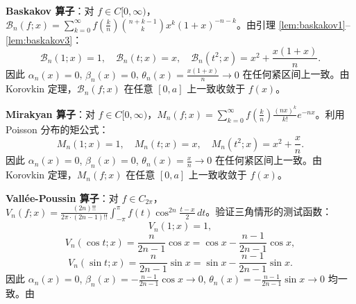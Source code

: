 \textbf{Baskakov 算子}：对 $f\in C[0,\infty)$，$\mathcal{B}_n(f;x)=\sum_{k=0}^\infty f(\frac{k}{n})\binom{n+k-1}{k}x^k(1+x)^{-n-k}$。由引理 \ref{lem:baskakov1}--\ref{lem:baskakov3}：
\[
\mathcal{B}_n(1;x)=1,\quad \mathcal{B}_n(t;x)=x,\quad \mathcal{B}_n(t^2;x)=x^2+\frac{x(1+x)}{n}.
\]
因此 $\alpha_n(x)=0$, $\beta_n(x)=0$, $\theta_n(x)=\frac{x(1+x)}{n}\to 0$ 在任何紧区间上一致。由 Korovkin 定理，$\mathcal{B}_n(f;x)$ 在任意 $[0,a]$ 上一致收敛于 $f(x)$。

\textbf{Mirakyan 算子}：对 $f\in C[0,\infty)$，$M_n(f;x)=\sum_{k=0}^\infty f(\frac{k}{n})\frac{(nx)^k}{k!}e^{-nx}$。利用 Poisson 分布的矩公式：
\[
M_n(1;x)=1,\quad M_n(t;x)=x,\quad M_n(t^2;x)=x^2+\frac{x}{n}.
\]
因此 $\alpha_n(x)=0$, $\beta_n(x)=0$, $\theta_n(x)=\frac{x}{n}\to 0$ 在任何紧区间上一致。由 Korovkin 定理，$M_n(f;x)$ 在任意 $[0,a]$ 上一致收敛于 $f(x)$。

\textbf{Vallée-Poussin 算子}：对 $f\in C_{2\pi}$，$V_n(f;x)=\frac{(2n)!!}{2\pi\cdot(2n-1)!!}\int_{-\pi}^\pi f(t)\cos^{2n}\frac{t-x}{2}\,dt$。验证三角情形的测试函数：
\[
V_n(1;x)=1,
\]
\[
V_n(\cos t;x) = \frac{n}{2n-1}\cos x = \cos x - \frac{n-1}{2n-1}\cos x,
\]
\[
V_n(\sin t;x) = \frac{n}{2n-1}\sin x = \sin x - \frac{n-1}{2n-1}\sin x.
\]
因此 $\alpha_n(x)=0$, $\beta_n(x)=-\frac{n-1}{2n-1}\cos x\to 0$, $\theta_n(x)=-\frac{n-1}{2n-1}\sin x\to 0$ 均一致。由 %
